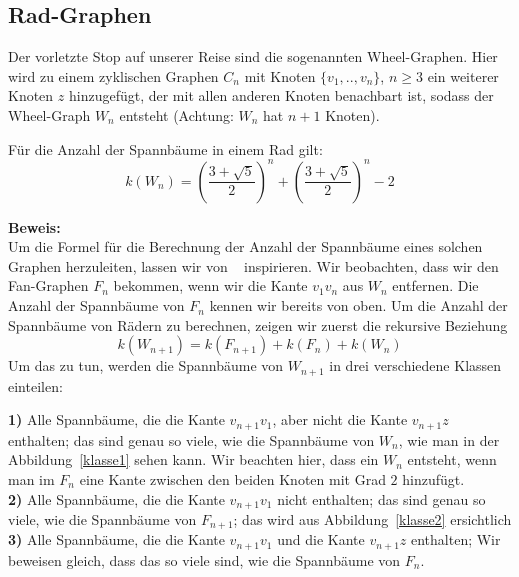 \subsection{Rad-Graphen}
Der vorletzte Stop auf unserer Reise sind die sogenannten Wheel-Graphen. Hier wird zu einem zyklischen Graphen $C_n$ mit Knoten $\{v_1,..,v_n\}$, $n \geq 3$ ein weiterer Knoten $z$ hinzugefügt, der mit allen anderen Knoten benachbart ist, sodass der Wheel-Graph $W_{n}$ entsteht (Achtung: $W_n$ hat $n+1$ Knoten).
\begin{Tm}
Für die Anzahl der Spannbäume in einem Rad gilt:
\begin{equation}
 \mathit{k}\left(W_n\right) = \left(\frac{3+\sqrt{5}}{2}\right)^n+\left(\frac{3+\sqrt{5}}{2}\right)^n-2
 \label{wn}
\end{equation}
\end{Tm}
\textbf{Beweis:}\\
Um die Formel für die Berechnung der Anzahl der Spannbäume eines solchen Graphen herzuleiten, lassen wir von ~\cite{sedlacek_1970} inspirieren.
Wir beobachten, dass wir den Fan-Graphen $F_n$ bekommen, wenn wir die Kante $v_1v_n$ aus $W_n$ entfernen.
Die Anzahl der Spannbäume von $F_n$ kennen wir bereits von oben.
Um die Anzahl der Spannbäume von Rädern zu berechnen, zeigen wir zuerst die rekursive Beziehung
\begin{equation}
 \mathit{k}\left(W_{n+1}\right) = \mathit{k}\left(F_{n+1}\right) + \mathit{k}\left(F_n\right) + \mathit{k}\left(W_n\right)
\end{equation}
Um das zu tun, werden die Spannbäume von $W_{n+1}$ in drei verschiedene Klassen einteilen:\\
\par
\begingroup
\leftskip=20pt
\rightskip=20pt
\noindent
\textbf{1)} Alle Spannbäume, die die Kante $v_{n+1}v_1$, aber nicht die Kante $v_{n+1}z$ enthalten; das sind genau so viele, wie die Spannbäume von $W_n$, wie man in der Abbildung~\ref{klasse1} sehen kann. Wir beachten hier, dass ein $W_n$ entsteht, wenn man im $F_n$ eine Kante zwischen den beiden Knoten mit Grad $2$ hinzufügt.\\
\textbf{2)} Alle Spannbäume, die die Kante $v_{n+1}v_1$ nicht enthalten; das sind genau so viele, wie die Spannbäume von $F_{n+1}$; das wird aus Abbildung~\ref{klasse2} ersichtlich\\
\textbf{3)} Alle Spannbäume, die die Kante $v_{n+1}v_1$ und die Kante $v_{n+1}z$ enthalten; Wir beweisen gleich, dass das so viele sind, wie die Spannbäume von $F_n$.\\
